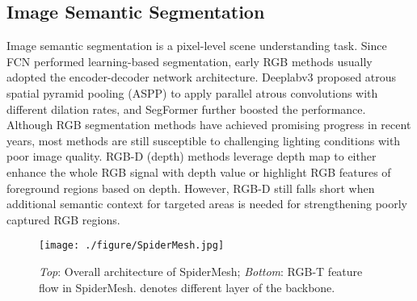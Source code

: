 \documentclass[letterpaper, 10 pt, conference]{ieeeconf}
\begin{document}
\subsection{Image Semantic Segmentation}
Image semantic segmentation is a pixel-level scene understanding task. Since FCN \cite{FCN} performed learning-based segmentation, early RGB methods \cite{segnet, unet} usually adopted the encoder-decoder network architecture. Deeplabv3 \cite{deeplabv3} proposed atrous spatial pyramid pooling (ASPP) to apply parallel atrous convolutions with different dilation rates, and SegFormer\cite{segformer} further boosted the performance. Although RGB segmentation methods have achieved promising progress in recent years, most methods are still susceptible to challenging lighting conditions with poor image quality. RGB-D (depth) methods \cite{fusenet, Wang_2018_ECCV, Cheng_2017_CVPR, Jiao_2019_CVPR, Xiong_2020_CVPR} leverage depth map to either enhance the whole RGB signal with depth value or highlight RGB features of foreground regions based on depth. However, RGB-D still falls short when additional semantic context for targeted areas is needed for strengthening poorly captured RGB regions.


\begin{figure*}
  \centering
  \texttt{[image: ./figure/SpiderMesh.jpg]}
  \caption{\textit{Top}: Overall architecture of SpiderMesh; \textit{Bottom}: RGB-T feature flow in SpiderMesh.  denotes different layer of the backbone.}
  \label{fig:spidermesh}
\end{figure*}
\end{document}
